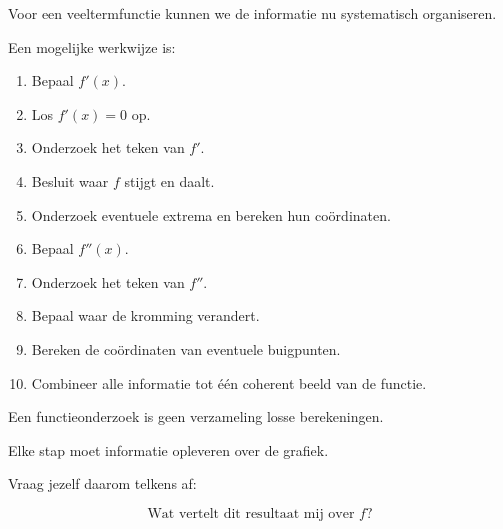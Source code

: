 \documentclass{ximera}
\begin{document}

Voor een veeltermfunctie kunnen we de informatie nu systematisch
organiseren.

Een mogelijke werkwijze is:

\begin{enumerate}

\item Bepaal $f'(x)$.

\item Los \(f'(x)=0\) op.

\item Onderzoek het teken van $f'$.

\item Besluit waar $f$ stijgt en daalt.

\item Onderzoek eventuele extrema en bereken hun coördinaten.

\item Bepaal $f''(x)$.

\item Onderzoek het teken van $f''$.

\item Bepaal waar de kromming verandert.

\item Bereken de coördinaten van eventuele buigpunten.

\item Combineer alle informatie tot één coherent beeld van de functie.

\end{enumerate}

\begin{opmerking}
Een functieonderzoek is geen verzameling losse berekeningen.

Elke stap moet informatie opleveren over de grafiek.

Vraag jezelf daarom telkens af:

\[
\boxed{\text{Wat vertelt dit resultaat mij over }f?}
\]
\end{opmerking}


\end{document}
